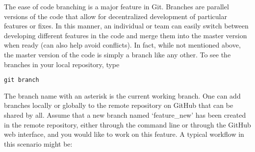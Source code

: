 \documentclass[letter,10pt]{article}
\begin{document}
The ease of code branching is a major feature in Git. Branches are parallel versions of the code that allow for decentralized development of particular features or fixes. In this manner, an individual or team can easily switch between developing different features in the code and merge them into the master version when ready (can also help avoid conflicts). In fact, while not mentioned above, the master version of the code is simply a branch like any other. To see the branches in your local repository, type
\begin{verbatim}
git branch
\end{verbatim}
The branch name with an asterisk is the current working branch. One can add branches locally or globally to the remote repository on GitHub that can be shared by all. Assume that a new branch named `feature\_new' has been created in the remote repository, either through the command line or through the GitHub web interface, and you would like to work on this feature. A typical workflow in this scenario might be:
\end{document}
